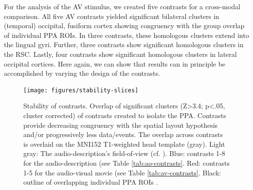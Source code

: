 \documentclass[english]{article}
\begin{document}



For the analysis of the AV stimulus, we created five contrasts for a cross-modal
comparison.
All five AV contrasts yielded significant bilateral clusters in (temporal)
occipital, fusiform cortex showing congruency with the group overlap of
individual PPA ROIs.
In three contrasts, these homologous clusters extend into the lingual
gyri.
Further, three contrasts show significant homologous clusters in the RSC.
Lastly, four contrasts show significant homologous clusters in lateral occipital
cortices.
Here again, we can show that results can in principle be accomplished by varying
the design of the contrasts.



\begin{figure} \centering
    \texttt{[image: figures/stability-slices]}
    \caption{Stability of contrasts. Overlap of significant clusters (Z>3.4;
        p<.05, cluster corrected) of contrasts created to isolate the PPA.
        Contrasts provide decreasing congruency with the spatial layout
        hypothesis and/or progressively less data/events. The overlap across
        contrasts is overlaid on the MNI152 T1-weighted head template (gray).
        Light gray: The audio-description's field-of-view (cf.
        \citep{hanke2014audiomovie}). Blue: contrasts 1-8 for the
        audio-description (see Table \ref{tab:ao-contrasts}. Red: contrasts 1-5
        for the audio-visual movie (see Table \ref{tab:av-contrasts}. Black:
        outline of overlapping individual PPA ROIs
        \citep{sengupta2016extension}.} \label{fig:stability-slices}
    \end{figure}
\end{document}
